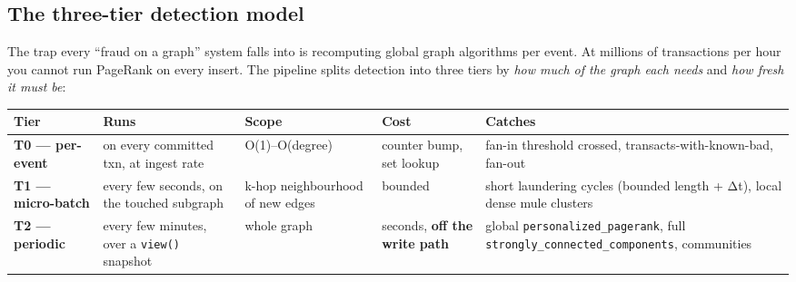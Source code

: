 \documentclass[
  11pt,
  openany]{book}
\begin{document}
\subsection{The three-tier detection
model}\label{the-three-tier-detection-model}

The trap every ``fraud on a graph'' system falls into is recomputing
global graph algorithms per event. At millions of transactions per hour
you cannot run PageRank on every insert. The pipeline splits detection
into three tiers by \emph{how much of the graph each needs} and
\emph{how fresh it must be}:

\begin{longtable}[]{@{}
  >{\raggedright\arraybackslash}p{}
  >{\raggedright\arraybackslash}p{}
  >{\raggedright\arraybackslash}p{}
  >{\raggedright\arraybackslash}p{}
  >{\raggedright\arraybackslash}p{}@{}}
\toprule\noalign{}
\begin{minipage}[b]{\linewidth}\raggedright
Tier
\end{minipage} & \begin{minipage}[b]{\linewidth}\raggedright
Runs
\end{minipage} & \begin{minipage}[b]{\linewidth}\raggedright
Scope
\end{minipage} & \begin{minipage}[b]{\linewidth}\raggedright
Cost
\end{minipage} & \begin{minipage}[b]{\linewidth}\raggedright
Catches
\end{minipage} \\
\midrule\noalign{}
\endhead
\bottomrule\noalign{}
\endlastfoot
\textbf{T0 --- per-event} & on every committed txn, at ingest rate &
O(1)--O(degree) & counter bump, set lookup & fan-in threshold crossed,
transacts-with-known-bad, fan-out \\
\textbf{T1 --- micro-batch} & every few seconds, on the touched subgraph
& k-hop neighbourhood of new edges & bounded & short laundering cycles
(bounded length + Δt), local dense mule clusters \\
\textbf{T2 --- periodic} & every few minutes, over a \texttt{view()}
snapshot & whole graph & seconds, \textbf{off the write path} & global
\texttt{personalized\_pagerank}, full
\texttt{strongly\_connected\_components}, communities \\
\end{longtable}
\end{document}
